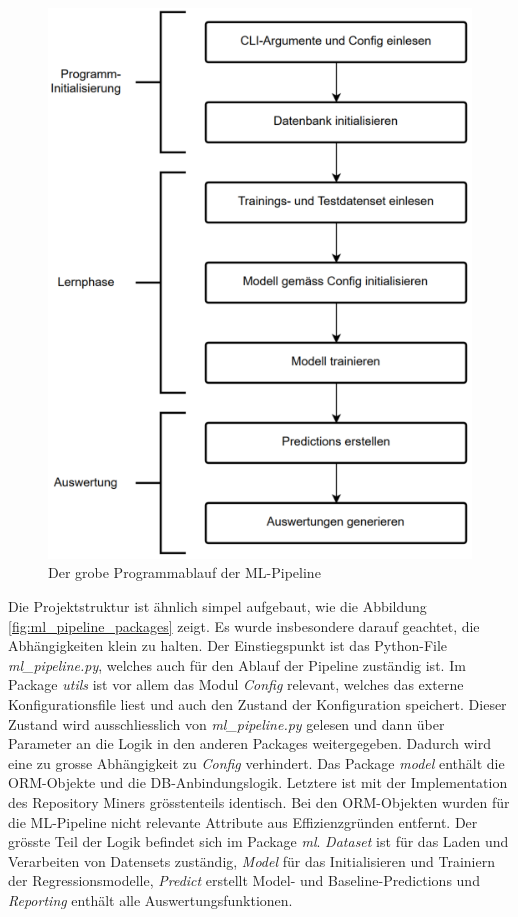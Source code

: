 \documentclass[10pt, a4paper]{article}
\begin{document}
\begin{figure}[h]
\centering
\includegraphics[width=0.7\linewidth]{resources/images/ml_pipeline_flowchart}
\caption[Programmablauf der ML-Pipeline]{Der grobe Programmablauf der ML-Pipeline}
\label{fig:ml_pipeline_flowchart}
\end{figure}



Die Projektstruktur ist ähnlich simpel aufgebaut, wie die Abbildung \ref{fig:ml_pipeline_packages} zeigt. Es wurde insbesondere darauf geachtet, die Abhängigkeiten klein zu halten. Der Einstiegspunkt ist das Python-File \emph{ml\_pipeline.py}, welches auch für den Ablauf der Pipeline zuständig ist.
Im Package \emph{utils} ist vor allem das Modul \emph{Config} relevant, welches das externe Konfigurationsfile liest und auch den Zustand der Konfiguration speichert. Dieser Zustand wird ausschliesslich von \emph{ml\_pipeline.py} gelesen und dann über Parameter an die Logik in den anderen Packages weitergegeben. Dadurch wird eine zu grosse Abhängigkeit zu \emph{Config} verhindert.
Das Package \emph{model} enthält die ORM-Objekte und die \ac{DB}-Anbindungslogik. Letztere ist mit der Implementation des Repository Miners grösstenteils identisch. Bei den ORM-Objekten wurden für die ML-Pipeline nicht relevante Attribute aus Effizienzgründen entfernt.
Der grösste Teil der Logik befindet sich im Package \emph{ml}. \emph{Dataset} ist für das Laden und Verarbeiten von Datensets zuständig, \emph{Model} für das Initialisieren und Trainiern der Regressionsmodelle, \emph{Predict} erstellt Model- und Baseline-Predictions und \emph{Reporting} enthält alle Auswertungsfunktionen. 
\end{document}
